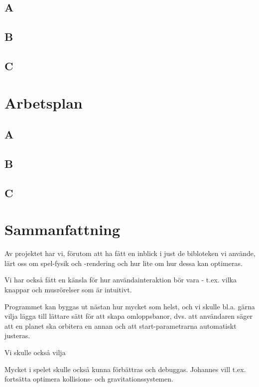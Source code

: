 \documentclass[a4paper, 11pt]{article}
\begin{document}
\subsection{A}


\subsection{B}


\subsection{C}


\section{Arbetsplan}
\label{sec:arbplan}

\subsection{A}


\subsection{B}


\subsection{C}


\section{Sammanfattning}

Av projektet har vi, förutom att ha fått en inblick i just de
bibloteken vi använde, lärt oss om spel-fysik och -rendering
och hur lite om hur dessa kan optimeras.

Vi har också fått en känsla för hur användainteraktion bör
vara - t.ex. vilka knappar och musrörelser som är intuitivt.

Programmet kan byggas ut nästan hur mycket som helst,
och vi skulle bl.a. gärna vilja lägga till lättare sätt
för att skapa omloppsbanor, dvs. att användaren säger att
en planet ska orbitera en annan och att start-parametrarna
automatiskt justeras.

Vi skulle också vilja

Mycket i spelet skulle också kunna förbättras och debuggas.
Johannes vill t.ex. fortsätta optimera kollisions- och gravitationssystemen.
\end{document}
